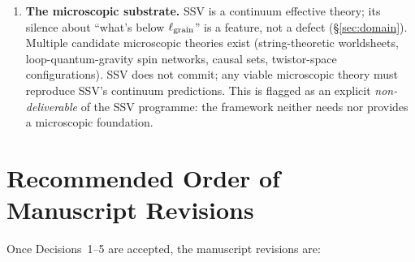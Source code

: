 \documentclass[11pt,a4paper]{article}
\begin{document}
\begin{enumerate}
      the framework's hierarchy puzzle, sharply posed.
\item \textbf{The microscopic substrate.}  SSV is a continuum effective
      theory; its silence about ``what's below $\ell_{\rm grain}$'' is
      a feature, not a defect (\S\ref{sec:domain}).  Multiple candidate
      microscopic theories exist (string-theoretic worldsheets,
      loop-quantum-gravity spin networks, causal sets, twistor-space
      configurations).  SSV does not commit; any viable microscopic
      theory must reproduce SSV's continuum predictions.  This is
      flagged as an explicit \emph{non-deliverable} of the SSV
      programme: the framework neither needs nor provides a
      microscopic foundation.
\end{enumerate}

\section{Recommended Order of Manuscript Revisions}

Once Decisions~1--5 are accepted, the manuscript revisions are:
\end{document}
